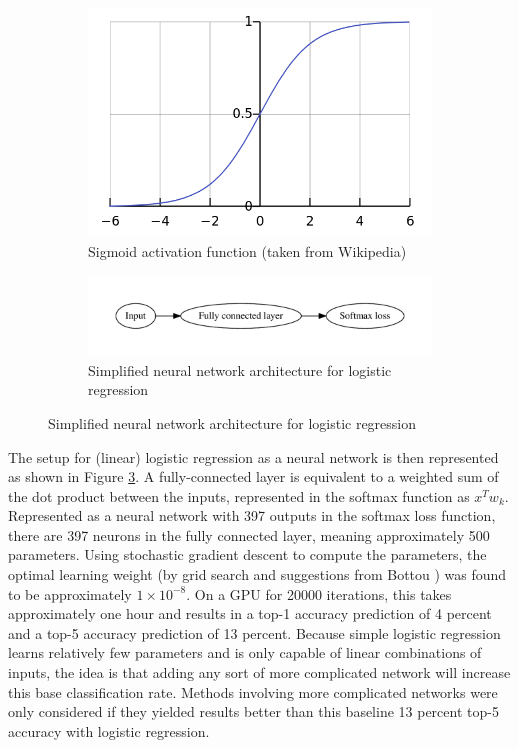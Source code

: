 \documentclass[10pt]{article}
\begin{document}
\begin{figure}[!ht]
\centering
\begin{subfigure}[b]{0.46\textwidth}
	\centering
	\includegraphics[width=\textwidth]{Logistic-curve.png}
	\caption{Sigmoid activation function (taken from Wikipedia)}
	\label{fig:sigmoid}
\end{subfigure}
\begin{subfigure}[b]{0.46\textwidth}
	\centering
	\includegraphics[width=\textwidth]{logreg.pdf}
	\caption{Simplified neural network architecture for logistic regression}
	\label{fig:logregnn}
\end{subfigure}
\end{figure}

The setup for (linear) logistic regression as a neural network is then represented as shown in Figure \ref{fig:logregnn}. A fully-connected layer is equivalent to a weighted sum of the dot product between the inputs, represented in the softmax function as $x^T w_k$. Represented as a neural network with 397 outputs in the softmax loss function, there are 397 neurons in the fully connected layer, meaning approximately 500 parameters. Using stochastic gradient descent to compute the parameters, the optimal learning weight (by grid search and suggestions from Bottou \cite{bottou_large-scale_2010}) was found to be approximately $1 \times 10^{-8}$. On a GPU for 20000 iterations, this takes approximately one hour and results in a top-1 accuracy prediction of 4 percent and a top-5 accuracy prediction of 13 percent. Because simple logistic regression learns relatively few parameters and is only capable of linear combinations of inputs, the idea is that adding any sort of more complicated network will increase this base classification rate. Methods involving more complicated networks were only considered if they yielded results better than this baseline 13 percent top-5 accuracy with logistic regression. 
\end{document}
